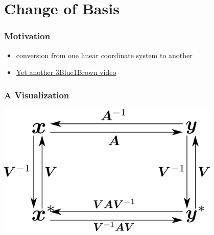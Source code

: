 \documentclass[aspectratio=169]{beamer}
\begin{document}
\section{Change of Basis}

\begin{frame}
    \frametitle{Motivation}

    \begin{itemize}
        \item conversion from one linear coordinate system to another
        \item \href{https://youtu.be/P2LTAUO1TdA?list=PLZHQObOWTQDPD3MizzM2xVFitgF8hE_ab}{Yet another 3Blue1Brown video}
    \end{itemize}
\end{frame}

\begin{frame}
    \frametitle{A Visualization}

    \begin{center}
        \includegraphics[width=0.8\textwidth]{change-of-basis.png}
    \end{center}
\end{frame}
\end{document}
